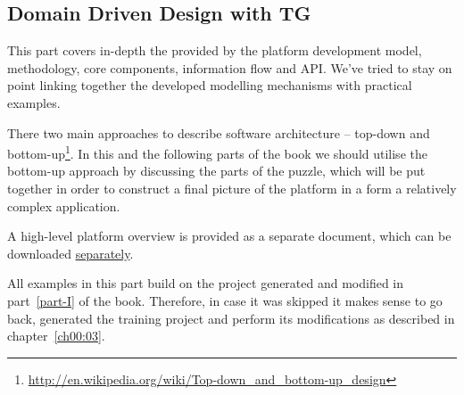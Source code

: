 \begin{partbacktext}
\part{Domain Driven Design with TG}  
  This part covers in-depth the provided by the platform development model, methodology, core components, information flow and API.
  We've tried to stay on point linking together the developed modelling mechanisms with practical examples.
  
  There two main approaches to describe software architecture -- top-down and bottom-up\footnote{\url{http://en.wikipedia.org/wiki/Top-down_and_bottom-up_design}}.
  In this and the following parts of the book we should utilise the bottom-up approach by discussing the parts of the puzzle, which will be put together in order to construct a final picture of the platform in a form a relatively complex application.

  A high-level platform overview is provided as a separate document, which can be downloaded \href{http://www.fielden.com.ua/trac/pnl-tg/attachment/wiki/WikiStart/architecture-overview.pdf}{separately}.

  All examples in this part build on the project generated and modified in part~\ref{part-I} of the book.
  Therefore, in case it was skipped it makes sense to go back, generated the training project and perform its modifications as described in chapter~\ref{ch00:03}.
\end{partbacktext}
